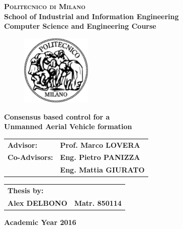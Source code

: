 \begin{titlepage}

\begin{center}
\Large{\textbf{\textsc{Politecnico di Milano}}}\\
\Large{\textbf{School of Industrial and Information Engineering}}\\
\large{\textbf{Computer Science and Engineering Course}}\\
\par
\end{center}

\vspace{0.2cm}

\begin{center}
\begin{figure}[h]
\centering{}
\includegraphics[width=0.3\textwidth]{title-page/logo-polimi}
\end{figure}
\par
\end{center}

\begin{center}
\LARGE{\textbf{Consensus based control for a} \\\textbf{Unmanned Aerial Vehicle formation}}
\vspace{1.0cm}
\par
\end{center}

\begin{flushleft}
\begin{tabular}{ll}
\textbf{Advisor:}      & \textbf{Prof. Marco LOVERA}\tabularnewline
\textbf{Co-Advisors:}  & \textbf{Eng. Pietro PANIZZA}\tabularnewline
                       & \textbf{Eng. Mattia GIURATO}\tabularnewline
\end{tabular}\vspace{0.3cm}
\par
\end{flushleft}

\begin{flushright}
\begin{tabular}{ll}
\textbf{Thesis by:} & \tabularnewline
\textbf{Alex DELBONO} & \textbf{Matr. 850114}\tabularnewline
\end{tabular}\vspace{1cm}
\par
\end{flushright}

\begin{center}
{\large{}\textbf{Academic Year 2016}}
\par
\end{center}{\large \par}

\end{titlepage}
